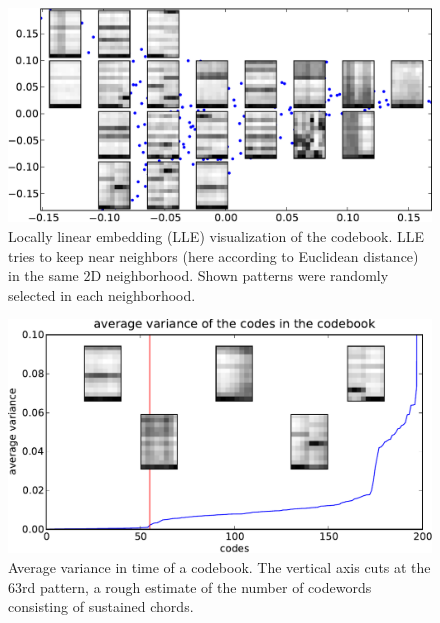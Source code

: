 \documentclass{article}
\begin{document}
\begin{figure}[htb]
\begin{center}
\includegraphics[width=.9\columnwidth]{codes_lle}
\end{center}
\caption{\small{
Locally linear embedding (LLE) visualization of the codebook.
LLE tries to keep near neighbors (here according to Euclidean distance)
in the same $2$D neighborhood. Shown patterns were randomly selected
in each neighborhood.
}}
\label{fig:lle}
\end{figure}

\begin{figure}[htb]
\begin{center}
\includegraphics[width=.9\columnwidth]{code_variance}
\end{center}
\caption{\small{Average variance in time of a codebook. The vertical
axis cuts at the $63$rd pattern, a rough estimate of the number of 
codewords consisting of sustained chords.
}}
\label{fig:code_var}
\end{figure}
\end{document}
